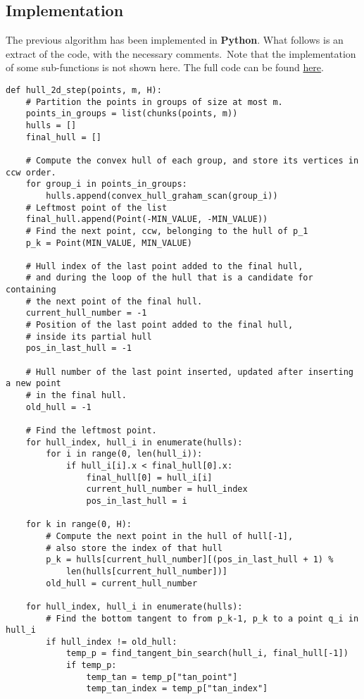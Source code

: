 \documentclass[
12pt,
a4paper,
oneside,
headinclude,
footinclude]{report}
\theoremstyle{definition} %
\begin{document}
\subsection{Implementation}
The previous algorithm has been implemented in \textbf{Python}. What follows is an extract of the code, with the necessary comments.\
Note that the implementation of some sub-functions is not shown here. The full code can be found \href{https://github.com/AlbertoParravicini/data_structures_and_algorithms/tree/master/Project}{here}.
\newpage
\begin{verbatim}
def hull_2d_step(points, m, H):
	# Partition the points in groups of size at most m.
	points_in_groups = list(chunks(points, m))
	hulls = []	
	final_hull = []
	
	# Compute the convex hull of each group, and store its vertices in ccw order.
	for group_i in points_in_groups:
		hulls.append(convex_hull_graham_scan(group_i))
	# Leftmost point of the list
	final_hull.append(Point(-MIN_VALUE, -MIN_VALUE))
	# Find the next point, ccw, belonging to the hull of p_1
	p_k = Point(MIN_VALUE, MIN_VALUE)
	
	# Hull index of the last point added to the final hull,
	# and during the loop of the hull that is a candidate for containing 
	# the next point of the final hull.
	current_hull_number = -1
	# Position of the last point added to the final hull, 
	# inside its partial hull
	pos_in_last_hull = -1
	
	# Hull number of the last point inserted, updated after inserting a new point 
	# in the final hull.
	old_hull = -1
	
	# Find the leftmost point.
	for hull_index, hull_i in enumerate(hulls):
		for i in range(0, len(hull_i)):
			if hull_i[i].x < final_hull[0].x:
				final_hull[0] = hull_i[i]
				current_hull_number = hull_index
				pos_in_last_hull = i
	
	for k in range(0, H):
		# Compute the next point in the hull of hull[-1],
		# also store the index of that hull
		p_k = hulls[current_hull_number][(pos_in_last_hull + 1) %
			len(hulls[current_hull_number])]
		old_hull = current_hull_number
	
	for hull_index, hull_i in enumerate(hulls):
		# Find the bottom tangent to from p_k-1, p_k to a point q_i in hull_i
		if hull_index != old_hull:
			temp_p = find_tangent_bin_search(hull_i, final_hull[-1])
			if temp_p:
				temp_tan = temp_p["tan_point"]
				temp_tan_index = temp_p["tan_index"]
		

\end{verbatim}
\end{document}
